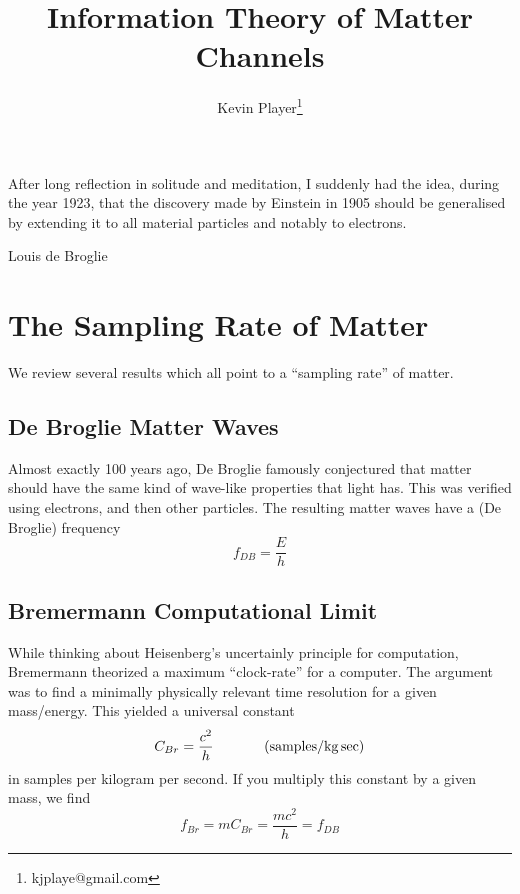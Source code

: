\documentclass[12pt,a4paper]{article}
\begin{document}
\title{Information Theory of Matter Channels}
\author[1]{Kevin Player\footnote{kjplaye@gmail.com}}

\maketitle

\epigraph{After long reflection in solitude and meditation, I suddenly had the idea, during the year 1923, that the discovery made by Einstein in 1905 should be generalised by extending it to all material particles and notably to electrons.}{Louis de Broglie}


\section{The Sampling Rate of Matter}
\label{rate}
We review several results which all point to a ``sampling rate'' of matter.
\subsection{De Broglie Matter Waves}
Almost exactly 100 years ago, De Broglie famously conjectured that matter should have the same kind of wave-like properties that light has.  This was verified using electrons, and then other particles.  The resulting matter waves have a (De Broglie) frequency
\[
  f_{DB} = \frac{E}{h}
\]

\subsection{Bremermann Computational Limit}
While thinking about Heisenberg's uncertainly principle for computation, Bremermann theorized a maximum ``clock-rate'' for a computer.  The argument was to find a minimally physically relevant time resolution for a given mass/energy.  This yielded a universal constant
\[
  C_{Br} = \frac{c^2}{h} \hspace{0.5 in} (\si[per-mode=symbol]{samples\per\kilogram.\sec})
\]
in samples per kilogram per second.  If you multiply this constant by a given mass, we find
\[
 f_{Br} = m C_{Br} = \frac{mc^2}{h} = f_{DB}
\]
\end{document}

